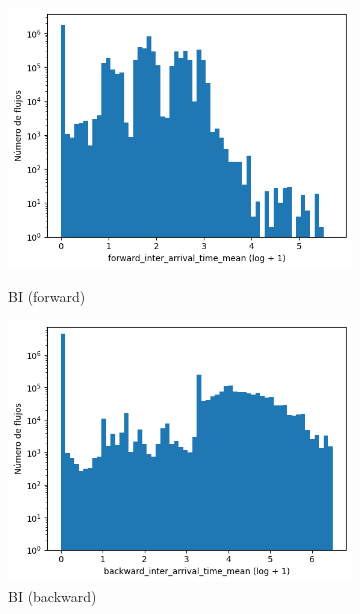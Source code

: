 \begin{figure}[H]
\begin{subfigure}[b]{0.32\textwidth}
        \includegraphics[width=\textwidth]{media/packet_pincer_botiot/forward_inter_arrival_time_mean_log_x_log_y.png}
        \caption{BI (forward)}
        \includegraphics[width=\textwidth]{media/packet_pincer_botiot/backward_inter_arrival_time_mean_log_x_log_y.png}
        \caption{BI (backward)}
    \end{subfigure}
    \hfill
    \begin{subfigure}[b]{0.32\textwidth}
        \centering

\end{subfigure}
\end{figure}
